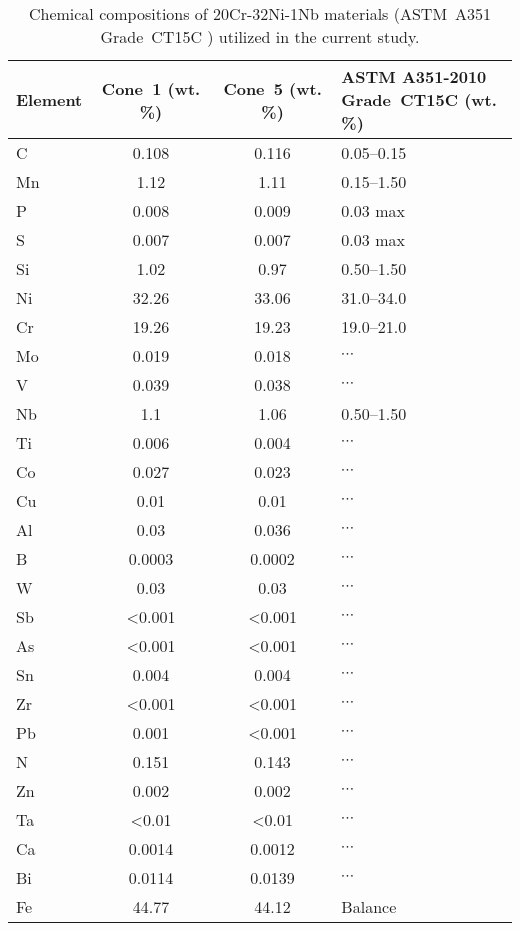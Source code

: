 \begin{table}
\caption{Chemical compositions of 20Cr-32Ni-1Nb materials (ASTM~A351 Grade~CT15C \cite{astm_a351_2010}) utilized in the current study.}
\begin{tabular}{l c c C{2in}}
\toprule
\textbf{Element} & \textbf{Cone~1 (wt. \%)} & \textbf{Cone~5 (wt. \%)} & \textbf{ASTM A351-2010 \newline Grade~CT15C (wt. \%)}\\
\midrule
C  & 0.108    & 0.116    & 0.05--0.15           \\
Mn & 1.12     & 1.11     & 0.15--1.50           \\
P  & 0.008    & 0.009    & 0.03 max            \\
S  & 0.007    & 0.007    & 0.03 max            \\
Si & 1.02     & 0.97     & 0.50--1.50           \\
Ni & 32.26    & 33.06    & 31.0--34.0           \\
Cr & 19.26    & 19.23    & 19.0--21.0           \\
Mo & 0.019    & 0.018    & $\cdots$                   \\
V  & 0.039    & 0.038    & $\cdots$                   \\
Nb & 1.1      & 1.06     & 0.50--1.50                  \\
Ti & 0.006    & 0.004    & $\cdots$                   \\
Co & 0.027    & 0.023    & $\cdots$           \\
Cu & 0.01     & 0.01     & $\cdots$                   \\
Al & 0.03     & 0.036    & $\cdots$                   \\
B  & 0.0003   & 0.0002   & $\cdots$                   \\
W  & 0.03     & 0.03     & $\cdots$                   \\
Sb & <0.001   & <0.001   & $\cdots$                   \\
As & <0.001   & <0.001   & $\cdots$                   \\
Sn & 0.004    & 0.004    & $\cdots$                   \\
Zr & <0.001   & <0.001   & $\cdots$                   \\
Pb & 0.001    & <0.001   & $\cdots$                   \\
N  & 0.151    & 0.143    & $\cdots$                   \\
Zn & 0.002    & 0.002    & $\cdots$                   \\
Ta & <0.01    & <0.01    & $\cdots$                   \\
Ca & 0.0014   & 0.0012   & $\cdots$                   \\
Bi & 0.0114   & 0.0139   & $\cdots$                   \\
Fe & 44.77    & 44.12    & Balance             \\
\bottomrule
\end{tabular}
\label{tab:ct15c-chemistry}
\end{table}